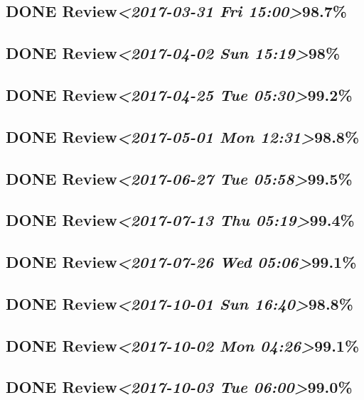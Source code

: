 \documentclass[11pt]{ctexart}
\begin{document}
\subsection{{\bfseries\sffamily DONE} Review\textit{<2017-03-31 Fri 15:00>}98.7\%}
\label{sec:orgbb2ead1}
\subsection{{\bfseries\sffamily DONE} Review\textit{<2017-04-02 Sun 15:19>}98\%}
\label{sec:orgd404dbb}
\subsection{{\bfseries\sffamily DONE} Review\textit{<2017-04-25 Tue 05:30>}99.2\%}
\label{sec:org9e20c8b}
\subsection{{\bfseries\sffamily DONE} Review\textit{<2017-05-01 Mon 12:31>}98.8\%}
\label{sec:org9084fa4}
\subsection{{\bfseries\sffamily DONE} Review\textit{<2017-06-27 Tue 05:58>}99.5\%}
\label{sec:org46046b4}
\subsection{{\bfseries\sffamily DONE} Review\textit{<2017-07-13 Thu 05:19>}99.4\%}
\label{sec:org4d0bb86}
\subsection{{\bfseries\sffamily DONE} Review\textit{<2017-07-26 Wed 05:06>}99.1\%}
\label{sec:org2b3234a}
\subsection{{\bfseries\sffamily DONE} Review\textit{<2017-10-01 Sun 16:40>}98.8\%}
\label{sec:org11c7bc4}
\subsection{{\bfseries\sffamily DONE} Review\textit{<2017-10-02 Mon 04:26>}99.1\%}
\label{sec:org930786e}

\subsection{{\bfseries\sffamily DONE} Review\textit{<2017-10-03 Tue 06:00>}99.0\%}
\label{sec:orgedf8033}
\end{document}
